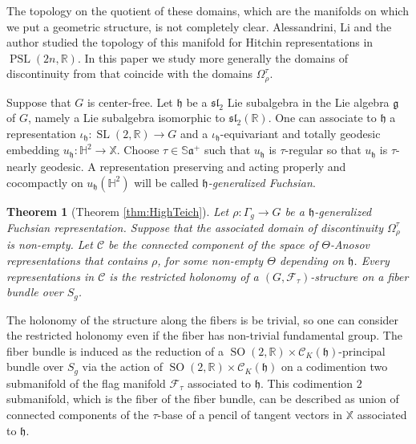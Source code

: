 \documentclass[reqno,10pt]{amsart}
\theoremstyle{plain}
\newtheorem{thm}{Theorem}[section]
\theoremstyle{definition}
\theoremstyle{remark}
\newcommand{\type}{\tau}
\newcommand{\R}{\mathbb{R}}
\newcommand{\Sph}{\mathbb{S}}
\DeclareMathOperator{\PSL}{PSL}
\DeclareMathOperator{\SL}{SL}
\DeclareMathOperator{\SO}{SO}
\newcommand{\X}{\mathbb{X}}
\newcommand{\ie}{namely }
\begin{document}
\medskip
 
The topology on the quotient of these domains, which are the manifolds on which we put a geometric structure, is not completely clear. Alessandrini, Li and the author \cite{ADL} studied the topology of this manifold for Hitchin representations in $\PSL(2n,\R)$. In this paper we study more generally the domains of discontinuity from \cite{KLP-DoD} that coincide with the domains $\Omega_\rho^\type$.

\medskip

Suppose that $G$ is center-free. Let $\mathfrak{h}$ be a $\mathfrak{sl}_2$ Lie subalgebra in the Lie algebra $\mathfrak{g}$ of $G$, \ie a Lie subalgebra isomorphic to $\mathfrak{sl}_2(\R)$. One can associate to $\mathfrak{h}$ a representation $\iota_\mathfrak{h}:\SL(2,\R)\to G$ and a $\iota_\mathfrak{h}$-equivariant and totally geodesic embedding $u_\mathfrak{h}:\mathbb{H}^2\to \X$. Choose $\type\in \Sph\mathfrak{a}^+$ such that $u_\mathfrak{h}$ is $\type$-regular so that $u_\mathfrak{h}$ is $\type$-nearly geodesic.
 A representation preserving and acting properly and cocompactly on $u_\mathfrak{h}\left(\mathbb{H}^2\right)$ will be called \emph{$\mathfrak{h}$-generalized Fuchsian}.

\begin{thm}[Theorem \ref{thm:HighTeich}]
\label{thm:IntroHighTeich}
Let $\rho:\Gamma_g\to G$ be a $\mathfrak{h}$-generalized Fuchsian representation. Suppose that the associated domain of discontinuity $\Omega_\rho^\type$ is non-empty.
Let $\mathcal{C}$ be the connected component of the space of $\Theta$-Anosov representations that contains $\rho$, for some non-empty $\Theta$ depending on $\mathfrak{h}$. Every representations in $\mathcal{C}$ is the restricted holonomy of a $\left(G,\mathcal{F}_{\type}\right)$-structure \emph{on a fiber bundle} over $S_g$.
\end{thm}

 The holonomy of the structure along the fibers is be trivial, so one can consider the restricted holonomy even if the fiber has non-trivial fundamental group. The fiber bundle is induced as the reduction of a $\SO(2,\R)\times \mathcal{C}_K(\mathfrak{h})$-principal bundle over $S_g$ via the action of $\SO(2,\R)\times \mathcal{C}_K(\mathfrak{h})$ on a codimention two submanifold of the flag manifold $\mathcal{F}_\type$ associated to $\mathfrak{h}$. This codimention $2$ submanifold, which is the fiber of the fiber bundle, can be described as union of connected components of the $\type$-base of a pencil of tangent vectors in $\X$ associated to $\mathfrak{h}$.
\end{document}
